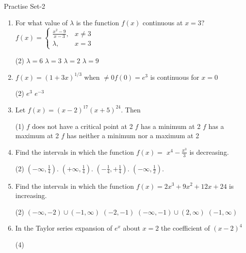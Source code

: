 \newpage
\begin{abox}
	Practise Set-2
	\end{abox}
\begin{enumerate}
	\item For what value of $\lambda$ is the function $f(x)$ continuous at $x=3 ?$
	$
	f(x)=\left\{\begin{aligned}
	\frac{x^{2}-9}{x-3}, & x \neq 3 \\
	\lambda, & x=3
	\end{aligned}\right.
	$
	\begin{tasks}(2)
		\task[\textbf{a.}]$\lambda=6$  
		\task[\textbf{b.}]$\lambda=3$  
		\task[\textbf{c.}]$\lambda=2$   
		\task[\textbf{d.}]$\lambda=9$   
	\end{tasks}
	\item $f(x)=(1+3 x)^{1 / 3}$ when $\neq 0 f(0)=e^{3}$ is continuous for $x=0$
	\begin{tasks}(2)
		\task[\textbf{c.}]$e^{3}$ 
		\task[\textbf{d.}]$e^{-3}$
	\end{tasks}
\item Let $f(x)=(x-2)^{17}(x+5)^{24}$. Then
\begin{tasks}(1)
	\task[\textbf{a.}] $f$ does not have a critical point at 2  
	\task[\textbf{b.}]$f$ has a minimum at 2
	\task[\textbf{c.}] $f$ has a maximum at 2
	\task[\textbf{d.}] $f$ has neither a minimum nor a maximum at 2
\end{tasks}
\item Find the intervals in which the function $f(x)=$ $x^{4}-\frac{x^{3}}{3}$ is decreasing.
\begin{tasks}(2)
	\task[\textbf{a.}]$\left(-\infty, \frac{1}{4}\right)$.  
	\task[\textbf{b.}]$\left(+\infty, \frac{1}{4}\right)$. 
	\task[\textbf{c.}]$\left(-\frac{1}{4}, +\frac{1}{4}\right)$.  
	\task[\textbf{d.}]$\left(-\infty, \frac{1}{2}\right)$.   
\end{tasks}
\item Find the intervals in which the function $f(x)=2 x^{3}+9 x^{2}+12 x+24$ is increasing.
\begin{tasks}(2)
	\task[\textbf{a.}] $(-\infty,-2) \cup(-1, \infty)$ 
	\task[\textbf{b.}]$(-2,-1)$
	\task[\textbf{c.}]$(-\infty,-1) \cup(2, \infty)$ 
	\task[\textbf{d.}]$(-1, \infty)$ 
\end{tasks}
\item In the Taylor series expansion of $e^{x}$ about $x=2$ the coefficient of $(x-2)^{4}$
\begin{tasks}(4)

\end{tasks}
\end{enumerate}
